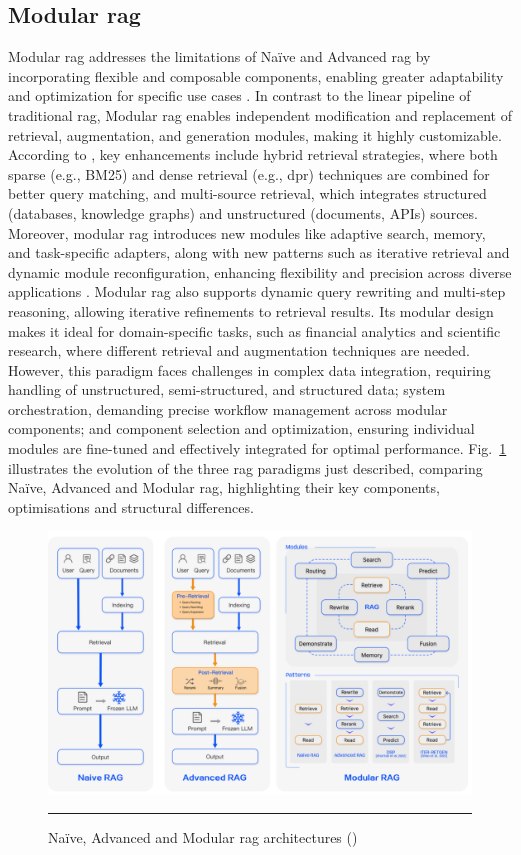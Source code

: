 \subsection*{Modular \gls{rag}}\label{sec:modular-rag}
Modular \gls{rag} addresses the limitations of Na\"ive and Advanced \gls{rag} by incorporating flexible and composable components, enabling greater adaptability and optimization for specific use cases \cite{gao_retrieval-augmented_2024}.
In contrast to the linear pipeline of traditional \gls{rag}, Modular \gls{rag} enables independent modification and replacement of retrieval, augmentation, and generation modules, making it highly customizable.
According to \cite{singh2025}, key enhancements include hybrid retrieval strategies, where both sparse (e.g., BM25) and dense retrieval \cite{Karpukhin2020} (e.g., \gls{dpr}) techniques are combined for better query matching, and multi-source retrieval, which integrates structured (databases, knowledge graphs) and unstructured (documents, APIs) sources.
Moreover, modular \gls{rag} introduces new modules like adaptive search, memory, and task-specific adapters, along with new patterns such as iterative retrieval and dynamic module reconfiguration, enhancing flexibility and precision across diverse applications \cite{gao_retrieval-augmented_2024}.
Modular \gls{rag} also supports dynamic query rewriting and multi-step reasoning, allowing iterative refinements to retrieval results.
Its modular design makes it ideal for domain-specific tasks, such as financial analytics and scientific research, where different retrieval and augmentation techniques are needed.
However, this paradigm faces challenges in complex data integration, requiring handling of unstructured, semi-structured, and structured data; system orchestration, demanding precise workflow management across modular components; and component selection and optimization, ensuring individual modules are fine-tuned and effectively integrated for optimal performance.
Fig.~\ref{fig:naive-advanced-modular-rag} illustrates the evolution of the three \gls{rag} paradigms just described, comparing Na\"ive, Advanced and Modular \gls{rag}, highlighting their key components, optimisations and structural differences.
\begin{figure}[htbp]
    \centering
 \includegraphics[width=.9\textwidth]{figures/literature-review/naive-advanced-modular-rag.png}
     \rule{35em}{0.5pt}
    \caption{Na\"ive, Advanced and Modular \gls{rag} architectures (\textcite{gao_retrieval-augmented_2024})}
 \label{fig:naive-advanced-modular-rag}
\end{figure}

